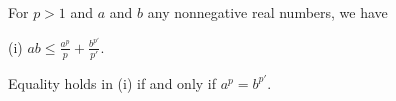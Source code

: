 For $p > 1$ and $a$ and $b$ any nonnegative real numbers, we have

(i) $ab \leq \frac{a^p}{p} + \frac{b^{p'}}{p'}$.

Equality holds in (i) if and only if $a^p = b^{p'}$.